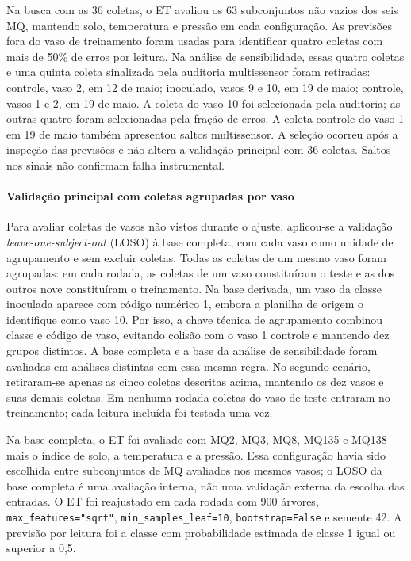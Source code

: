 Na busca com as 36 coletas, o ET avaliou os 63 subconjuntos não vazios dos
seis MQ, mantendo solo, temperatura e pressão em cada configuração. As
previsões fora do vaso de treinamento foram usadas para identificar quatro
coletas com mais de 50\% de erros por leitura. Na análise de sensibilidade,
essas quatro coletas e uma quinta coleta sinalizada pela auditoria
multissensor foram retiradas: controle, vaso 2, em 12 de maio; inoculado,
vasos 9 e 10, em 19 de maio; controle, vasos 1 e 2, em 19 de maio.
A coleta do vaso 10 foi selecionada pela auditoria; as outras quatro foram
selecionadas pela fração de erros. A coleta controle do vaso 1 em 19 de maio
também apresentou saltos multissensor. A seleção ocorreu após a inspeção das
previsões e não altera a validação principal com 36 coletas. Saltos nos
sinais não confirmam falha instrumental.

\paragraph{Validação principal com coletas agrupadas por vaso}
\label{subsec:loso_complementar}

Para avaliar coletas de vasos não vistos durante o ajuste, aplicou-se a
validação \textit{leave-one-subject-out} (LOSO) à base completa,
com cada vaso como unidade de agrupamento e sem excluir coletas. Todas as
coletas de um mesmo vaso foram agrupadas:
em cada rodada, as coletas de um vaso constituíram o teste e as dos outros
nove constituíram o treinamento. Na base derivada, um vaso da classe
inoculada aparece com código numérico 1, embora a planilha de origem o
identifique como vaso 10. Por isso, a chave técnica de agrupamento combinou
classe e código de vaso, evitando colisão com o vaso 1 controle e mantendo
dez grupos distintos.
A base completa e a base da análise de sensibilidade
foram avaliadas em análises distintas com essa mesma regra. No segundo cenário,
retiraram-se apenas as cinco coletas descritas acima, mantendo os dez
vasos e suas demais coletas. Em nenhuma rodada coletas do vaso de teste
entraram no treinamento; cada leitura incluída foi testada uma vez.

Na base completa, o ET foi avaliado com MQ2, MQ3, MQ8, MQ135 e MQ138 mais
o índice de solo, a temperatura e a pressão. Essa configuração havia sido
escolhida entre subconjuntos de MQ avaliados nos mesmos vasos; o LOSO da
base completa é uma avaliação interna, não uma validação externa da
escolha das entradas.
O ET foi reajustado em
cada rodada com 900 árvores,
\texttt{max\_features="sqrt"}, \texttt{min\_samples\_leaf=10},
\texttt{bootstrap=False} e semente 42. A previsão por leitura foi a classe
com probabilidade estimada de classe 1 igual ou superior a 0,5.

